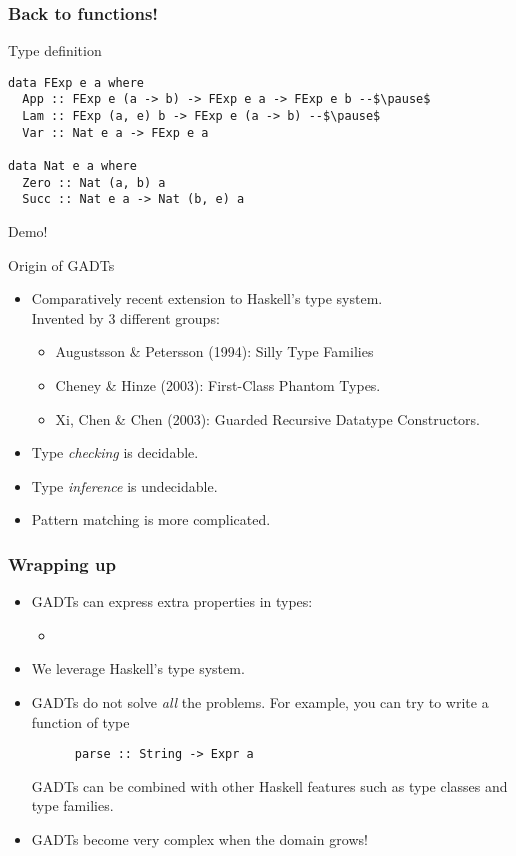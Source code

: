 \documentclass[pdftex,aspectratio=169]{beamer}
\begin{document}
\begin{frame}[fragile]
  \frametitle{Back to functions!}
  \begin{block}{Type definition}
  \begin{lstlisting}
data FExp e a where
  App :: FExp e (a -> b) -> FExp e a -> FExp e b --$\pause$
  Lam :: FExp (a, e) b -> FExp e (a -> b) --$\pause$
  Var :: Nat e a -> FExp e a

data Nat e a where
  Zero :: Nat (a, b) a
  Succ :: Nat e a -> Nat (b, e) a
\end{lstlisting}
\end{block}\pause
Demo!
\end{frame}

\begin{frame}{Origin of GADTs}
  \begin{itemize}
  \item<1-> Comparatively recent extension to Haskell's type system.\\
    Invented by 3 different groups:
    \begin{itemize}
    \item Augustsson \& Petersson (1994): Silly Type Families
    \item Cheney \& Hinze (2003): First-Class Phantom Types.
    \item Xi, Chen \& Chen (2003): Guarded Recursive Datatype Constructors.
    \end{itemize}
  \item<2-> Type \emph{checking} is decidable.
  \item<3-> Type \emph{inference} is undecidable.
  \item<4-> Pattern matching is more complicated.
  \end{itemize}
  
\end{frame}

\begin{frame}[fragile]
  \frametitle{Wrapping up}
  \begin{itemize}[<+->]
  \item GADTs can express extra properties in types:
    \begin{itemize}
    \item 
    \end{itemize}
  \item We leverage Haskell's type system.
  \item GADTs do not solve \emph{all} the problems.
    For example, you can try to write a function of type
    \begin{lstlisting}
      parse :: String -> Expr a
    \end{lstlisting}
    \pause
    GADTs can be combined with other Haskell features such as type
    classes and type families. 
  \item GADTs become very complex when the domain grows!
  \end{itemize}
\end{frame}
\end{document}
